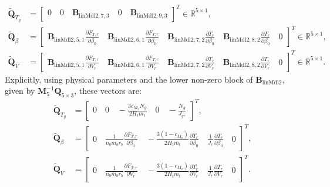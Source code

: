     \begin{align*}
        \tilde{\mathbf{Q}}_{T_g} &= \begin{bmatrix}
            0 \quad
            0 \quad
            \bm{B}_{\text{linMdl2}, 7, 3}  \quad
            0 \quad \bm{B}_{\text{linMdl2}, 9, 3} 
        \end{bmatrix}^T \in \mathbb{R}^{5 \times 1},\\
        \tilde{\mathbf{Q}}_{\beta} &= \begin{bmatrix}
            \bm{B}_{\text{linMdl2}, 5, 1} \frac{\partial F_{T,r}}{\partial{\beta_0}} \quad
            \bm{B}_{\text{linMdl2}, 6, 1} \frac{\partial F_{T,r}}{\partial{\beta_0}} \quad
            \bm{B}_{\text{linMdl2}, 7, 2} \frac{\partial T_r}{\partial{\beta_0}} \quad 
            \bm{B}_{\text{linMdl2}, 8, 2} \frac{\partial T_r}{\partial{\beta_0}} \quad  0
        \end{bmatrix}^T  \in \mathbb{R}^{5 \times 1}, \\
        \tilde{\mathbf{Q}}_V &=\begin{bmatrix}
            \bm{B}_{\text{linMdl2}, 5, 1} \frac{\partial F_{T,r}}{\partial{V_r }} \quad
            \bm{B}_{\text{linMdl2}, 6, 1} \frac{\partial F_{T,r}}{\partial{V_r }} \quad
            \bm{B}_{\text{linMdl2}, 7, 2} \frac{\partial T_r}{\partial{V_r }} \quad 
            \bm{B}_{\text{linMdl2}, 8, 2} \frac{\partial T_r}{\partial{V_r }} \quad 0
        \end{bmatrix}^T  \in \mathbb{R}^{5 \times 1}.
    \end{align*}
    Explicitly, using physical parameters and the lower non-zero block of \(\bm{B}_{\text{linMdl2}}\), given by \(\mathbf{M}_5^{-1} \mathbf{Q}_{5 \times 3}\), these vectors are:
    \begin{align*}
        \tilde{\mathbf{Q}}_{T_g} &= 
        \begin{bmatrix}
            0 \quad 0 \quad -\frac{3c_{M_x}N_g}{2H_t m_t} \quad 0 \quad -\frac{N_g}{J_{gr}}
        \end{bmatrix}^T, \\
        \tilde{\mathbf{Q}}_{\beta} &= 
        \begin{bmatrix}
            0 \quad
            \frac{1}{n_b m_b r_b} \frac{\partial F_{T,r}}{\partial \beta_0} \quad
            -\frac{3(1-c_{M_x})}{2 H_t m_t} \frac{\partial T_r}{\partial \beta_0} \quad
            \frac{1}{J_r} \frac{\partial T_r}{\partial \beta_0} \quad
            0
        \end{bmatrix}^T, \\
        \tilde{\mathbf{Q}}_V &= 
        \begin{bmatrix}
            0 \quad
            \frac{1}{n_b m_b r_b} \frac{\partial F_{T,r}}{\partial V_r} \quad
            -\frac{3(1-c_{M_x})}{2 H_t m_t} \frac{\partial T_r}{\partial V_r} \quad
            \frac{1}{J_r} \frac{\partial T_r}{\partial V_r} \quad
            0
        \end{bmatrix}^T.
    \end{align*}
